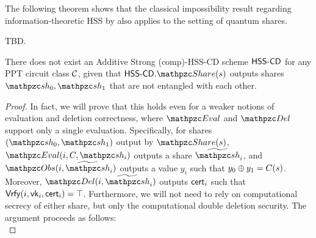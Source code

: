 The following theorem shows that the classical impossibility result
regarding information-theoretic HSS by \cite{ITCS:BGILT18} also
applies to the setting of quantum shares.

\begin{theorem}
TBD.
\end{theorem}

\begin{theorem}
There does not exist an Additive Strong (comp)-HSS-CD scheme
$\mathsf{HSS\textrm{-}CD}$ for
any PPT circuit class $\mathcal{C}$, 
given that $\HSScd.\Sh(s)$ outputs shares $\qsh_0, \qsh_1$ that are
not entangled with each other.
\end{theorem}
\begin{proof}
In fact, we will prove that this holds even for a weaker notions of
evaluation and deletion correctness, where $\Ev$ and $\Del$ support
only a single evaluation. Specifically, for shares $(\qsh_0,
\qsh_1)$ output by $\Sh(s)$, $\Ev(i, C, \qsh_i)$ outputs a share
$\nqsh_i$, and $\Obs(i, \nqsh_i)$ outputs a value $y_i$ such that
$y_0 \oplus y_1 = C(s)$. Moreover, $\Del(i, \nqsh_i)$ outputs
$\mathsf{cert}_i$ such that $\mathsf{Vrfy}(i, \mathsf{vk}_i, \mathsf{cert}_i) = \top$. Furthermore,
we will not need to rely on computational secrecy of either share,
but only the computational double deletion security.
The argument proceeds as follows:\\


\end{proof}
